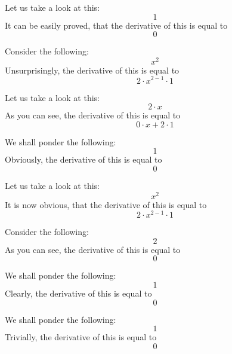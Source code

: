 \documentclass{article}
\begin{document}
Let us take a look at this:
\begin{equation}
1 
\end{equation}
It can be easily proved, that the derivative of this is equal to
\begin{equation}
0 
\end{equation}

Consider the following:
\begin{equation}
x ^{2 } 
\end{equation}
Unsurprisingly, the derivative of this is equal to
\begin{equation}
2 \cdot x ^{2 - 1 } \cdot 1 
\end{equation}

Let us take a look at this:
\begin{equation}
2 \cdot x 
\end{equation}
As you can see, the derivative of this is equal to
\begin{equation}
0 \cdot x + 2 \cdot 1 
\end{equation}

We shall ponder the following:
\begin{equation}
1 
\end{equation}
Obviously, the derivative of this is equal to
\begin{equation}
0 
\end{equation}

Let us take a look at this:
\begin{equation}
x ^{2 } 
\end{equation}
It is now obvious, that the derivative of this is equal to
\begin{equation}
2 \cdot x ^{2 - 1 } \cdot 1 
\end{equation}

Consider the following:
\begin{equation}
2 
\end{equation}
As you can see, the derivative of this is equal to
\begin{equation}
0 
\end{equation}

We shall ponder the following:
\begin{equation}
1 
\end{equation}
Clearly, the derivative of this is equal to
\begin{equation}
0 
\end{equation}

We shall ponder the following:
\begin{equation}
1 
\end{equation}
Trivially, the derivative of this is equal to
\begin{equation}
0 
\end{equation}
\end{document}
